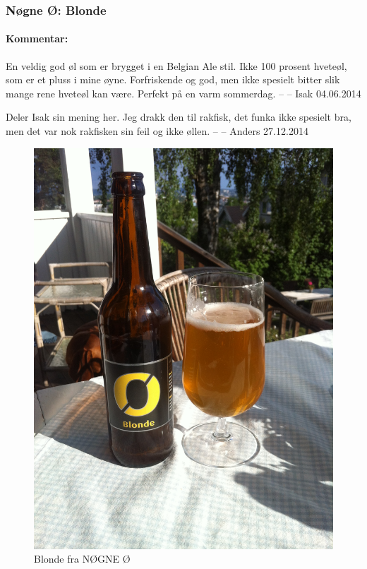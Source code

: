 \documentclass[12pt,a4paper,oneside,norsk]{article}
\begin{document}
\newpage
\subsubsection{Nøgne Ø: Blonde}
\paragraph{Kommentar:} En veldig god øl som er brygget i en Belgian Ale stil. Ikke 100 prosent hveteøl, som er et pluss i mine øyne. Forfriskende og god, men ikke spesielt bitter slik mange rene hveteøl kan være. Perfekt på en varm sommerdag. 
\newline
-- -- Isak 04.06.2014

Deler Isak sin mening her. Jeg drakk den til rakfisk, det funka ikke spesielt bra, men det var nok rakfisken sin feil og ikke øllen. 
\newline
-- -- Anders 27.12.2014

\begin{figure} [H]
\centering
\includegraphics[scale=0.1, angle=270]{Bilder/Ol/nogneblonde}
\caption{Blonde fra NØGNE Ø}
\end{figure}
\end{document}
